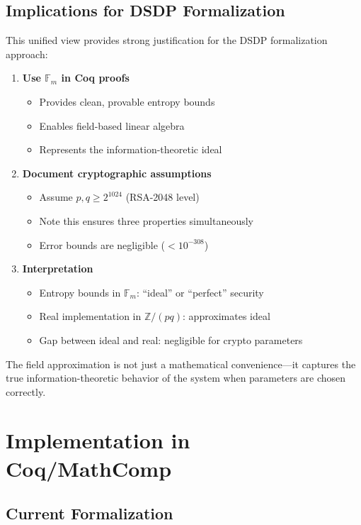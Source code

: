 \documentclass[11pt]{article}
\theoremstyle{definition}
\begin{document}
\subsection{Implications for DSDP Formalization}

This unified view provides strong justification for the DSDP formalization approach:

\begin{enumerate}
\item \textbf{Use $\mathbb{F}_m$ in Coq proofs}
\begin{itemize}
\item Provides clean, provable entropy bounds
\item Enables field-based linear algebra
\item Represents the information-theoretic ideal
\end{itemize}

\item \textbf{Document cryptographic assumptions}
\begin{itemize}
\item Assume $p, q \geq 2^{1024}$ (RSA-2048 level)
\item Note this ensures three properties simultaneously
\item Error bounds are negligible ($< 10^{-308}$)
\end{itemize}

\item \textbf{Interpretation}
\begin{itemize}
\item Entropy bounds in $\mathbb{F}_m$: ``ideal'' or ``perfect'' security
\item Real implementation in $\mathbb{Z}/(pq)$: approximates ideal
\item Gap between ideal and real: negligible for crypto parameters
\end{itemize}
\end{enumerate}

The field approximation is not just a mathematical convenience—it captures the true information-theoretic behavior of the system when parameters are chosen correctly.

\section{Implementation in Coq/MathComp}

\subsection{Current Formalization}
\end{document}
